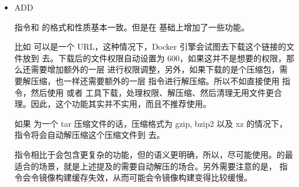 \documentclass[letterpaper,10pt,english]{sphinxmanual}
\begin{document}
\begin{itemize}
\begin{sphinxVerbatim}[commandchars=\\\{\}]
   
   
   
   
\end{sphinxVerbatim}

\item {} 
ADD

 指令和  的格式和性质基本一致。但是在  基础上增加了一些功能。

比如  可以是一个 URL，这种情况下，Docker 引擎会试图去下载这个链接的文件放到  去。下载后的文件权限自动设置为 600，如果这并不是想要的权限，那么还需要增加额外的一层  进行权限调整，另外，如果下载的是个压缩包，需要解压缩，也一样还需要额外的一层  指令进行解压缩。所以不如直接使用  指令，然后使用  或者  工具下载，处理权限、解压缩、然后清理无用文件更合理。因此，这个功能其实并不实用，而且不推荐使用。

如果  为一个 tar 压缩文件的话，压缩格式为 gzip, bzip2 以及 xz 的情况下， 指令将会自动解压缩这个压缩文件到  去。

指令相比于会包含更复杂的功能，但的语义更明确，所以，尽可能使用。的最适合的场景，就是上述提及的需要自动解压的场合。另外需要注意的是， 指令会令镜像构建缓存失效，从而可能会令镜像构建变得比较缓慢。


\end{itemize}
\end{document}

